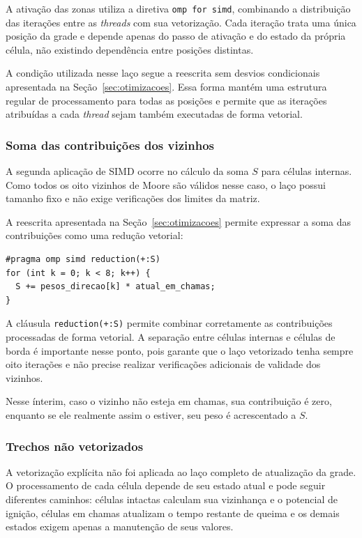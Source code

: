\documentclass[11pt,a4paper]{article}
\begin{document}
A ativação das zonas utiliza a diretiva \texttt{omp for simd}, combinando a distribuição das iterações entre as \emph{threads} com sua vetorização. Cada iteração trata uma única posição da grade e depende apenas do passo de ativação e do estado da própria célula, não existindo dependência entre posições distintas.

A condição utilizada nesse laço segue a reescrita sem desvios condicionais apresentada na Seção~\ref{sec:otimizacoes}. Essa forma mantém uma estrutura regular de processamento para todas as posições e permite que as iterações atribuídas a cada \emph{thread} sejam também executadas de forma vetorial.

\subsubsection{Soma das contribuições dos vizinhos} 

A segunda aplicação de SIMD ocorre no cálculo da soma $S$ para células internas. Como todos os oito vizinhos de Moore são válidos nesse caso, o laço possui tamanho fixo e não exige verificações dos limites da matriz. 

A reescrita apresentada na Seção~\ref{sec:otimizacoes} permite expressar a soma das contribuições como uma redução vetorial: 
\begin{lstlisting} 
#pragma omp simd reduction(+:S) 
for (int k = 0; k < 8; k++) { 
  S += pesos_direcao[k] * atual_em_chamas; 
} 
\end{lstlisting}

A cláusula \texttt{reduction(+:S)} permite combinar corretamente as contribuições processadas de forma vetorial. A separação entre células internas e células de borda é importante nesse ponto, pois garante que o laço vetorizado tenha sempre oito iterações e não precise realizar verificações adicionais de validade dos vizinhos.

Nesse ínterim, caso o vizinho não esteja em chamas, sua contribuição é zero, enquanto se ele realmente assim o estiver, seu peso é acrescentado a $S$. 

\subsubsection{Trechos não vetorizados}

A vetorização explícita não foi aplicada ao laço completo de atualização da grade. O processamento de cada célula depende de seu estado atual e pode seguir diferentes caminhos: células intactas calculam sua vizinhança e o potencial de ignição, células em chamas atualizam o tempo restante de queima e os demais estados exigem apenas a manutenção de seus valores.
\end{document}
